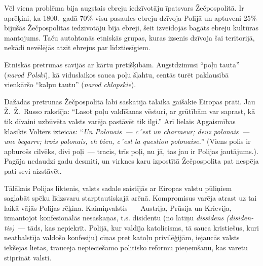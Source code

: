 \documentclass[twoside,a5paper,12pt,fleqn,openany]{extbook}
\newcommand{\pltxti}[1]{\textit{\textpolish{#1}}}
\newcommand{\frtxti}[1]{\textit{\textfrench{#1}}}
\newcommand{\latxti}[1]{\textit{\textlatin{#1}}}
\begin{document}
Vēl viena problēma bija augstais ebreju iedzīvotāju īpatsvars Žečpospolitā. Ir aprēķini, ka 1800.~gadā 70\% visu pasaules ebreju dzīvoja Polijā un aptuveni 25\% bijušās Žečpospolitas iedzīvotāju bija ebreji, šeit izveidojās bagāts ebreju kultūras mantojums. Taču autohtonās etniskās grupas, kuras izsenis dzīvoja šai teritorijā, nekādi nevēlējās atzīt ebrejus par līdztiesīgiem.

Etniskās pretrunas savijās ar kārtu pretišķībām. Augstdzimusī ``poļu tauta'' (\pltxti{narod Polski}), kā viduslaikos sauca poļu šļahtu, centās turēt paklausībā vienkāršo ``kalpu tautu'' (\pltxti{narod chlopskie}).

Dažādās pretrunas Žečpospolitā labi saskatīja tālaika gaišākie Eiropas prāti. Jau Ž.~Ž.~Russo rakstīja: ``Lasot poļu valdīšanas vēsturi, ar grūtībām var saprast, kā tik dīvaini uzbūvēta valsts varēja pastāvēt tik ilgi.'' Arī lielais Apgaismības klasiķis Voltērs izteicās: ``\frtxti{Un Polonais~--- c´est un charmeur; deuz polonais~--- une begarre; trois polonais, eh bien, c´est la question polonaise.}'' (Viens polis ir apburošs cilvēks, divi poļi~--- tracis, trīs poļi, nu jā, tas jau ir Polijas jautājums.). Pagāja nedaudzi gadu desmiti, un virknes karu izpostītā Žečpospolita pat nespēja pati sevi aizstāvēt.

Tālākais Polijas liktenis, valsts sadale saistījās ar Eiropas valstu pūliņiem saglabāt spēku līdzsvaru starptautiskajā arēnā. Kompromisus varēja atrast uz tai laikā vājās Polijas rēķina. Kaimiņvalstis~--- Austrija, Prūsija un Krievija, izmantojot konfesionālās nesaskaņas, t.s. disidentu (no latīņu \latxti{dissidens (disidentis)}~--- tāds, kas nepiekrīt. Polijā, kur valdīja katolicisms, tā sauca kristiešus, kuri neatbalstīja valdošo konfesiju) cīņas pret katoļu privilēģijām, iejaucās valsts iekšējās lietās, traucēja nepieciešamo politisko reformu pieņemšanu, kas varētu stiprināt valsti.
\end{document}
